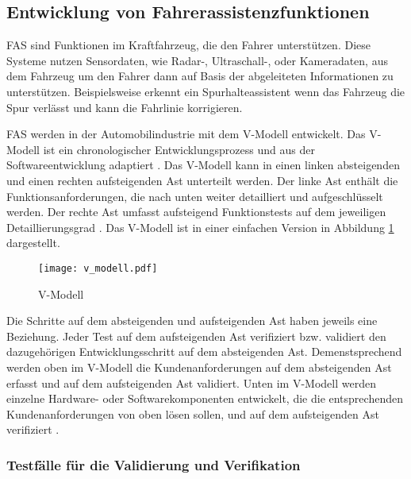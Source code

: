 \subsection{Entwicklung von Fahrerassistenzfunktionen}
\label{grundlagen_fahren_entwicklung}

\ac{FAS} sind Funktionen im Kraftfahrzeug, die den Fahrer unterstützen. Diese Systeme nutzen Sensordaten, wie Radar-, Ultraschall-, oder Kameradaten, aus dem Fahrzeug um den Fahrer dann auf Basis der abgeleiteten Informationen zu unterstützen. Beispielsweise erkennt ein Spurhalteassistent wenn das Fahrzeug die Spur verlässt und kann die Fahrlinie korrigieren. 

\ac{FAS} werden in der Automobilindustrie mit dem V-Modell entwickelt. Das V-Modell ist ein chronologischer Entwicklungsprozess und aus der Softwareentwicklung adaptiert \cite{vmodell2005}. Das V-Modell kann in einen linken absteigenden und einen rechten aufsteigenden Ast unterteilt werden. Der linke Ast enthält die Funktionsanforderungen, die nach unten weiter detailliert und aufgeschlüsselt werden. Der rechte Ast umfasst aufsteigend Funktionstests auf dem jeweiligen Detaillierungsgrad \cite{hakuli2015virtuelle}. Das V-Modell ist in einer einfachen Version in Abbildung \ref{fig_v_modell} dargestellt.

\begin{figure}[h]
\centering
\texttt{[image: v\_modell.pdf]}
\caption{V-Modell \cite{hakuli2015virtuelle}}
\label{fig_v_modell}
\end{figure}

Die Schritte auf dem absteigenden und aufsteigenden Ast haben jeweils eine Beziehung. Jeder Test auf dem aufsteigenden Ast verifiziert bzw. validiert den dazugehörigen Entwicklungsschritt auf dem absteigenden Ast. Demenstsprechend werden oben im V-Modell die Kundenanforderungen auf dem absteigenden Ast erfasst und auf dem aufsteigenden Ast validiert. Unten im V-Modell werden einzelne Hardware- oder Softwarekomponenten entwickelt, die die entsprechenden Kundenanforderungen von oben lösen sollen, und auf dem aufsteigenden Ast verifiziert \cite{hakuli2015virtuelle}.


\subsubsection{Testfälle für die Validierung und Verifikation}


